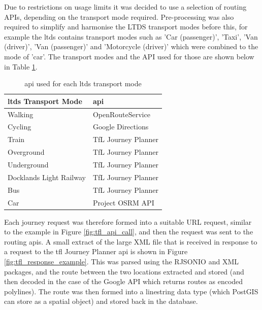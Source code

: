 Due to restrictions on usage limits it was decided to use a selection of routing APIs, depending on the transport mode required. Pre-processing was also required to simplify and harmonise the LTDS transport modes before this, for example the \gls{ltds} contains transport modes such as 'Car (passenger)', 'Taxi', 'Van (driver)', 'Van (passenger)' and 'Motorcycle (driver)' which were combined to the mode of 'car'. The transport modes and the API used for those are shown below in Table \ref{tab:api_transport_modes}.

\begin{table}[H]
\caption{\gls{api} used for each \gls{ltds} transport mode}
\centering
    \begin{tabular}{ | l | l |}
    \hline 
     \bfseries{\gls{ltds} Transport Mode} & \bfseries{\gls{api}}  \\ \hline
     Walking                    & OpenRouteService    \\ \hline
     Cycling                    & Google Directions   \\ \hline
     Train                      & TfL Journey Planner \\ \hline
     Overground                 & TfL Journey Planner \\ \hline
     Underground                & TfL Journey Planner \\ \hline
     Docklands Light Railway    & TfL Journey Planner \\ \hline
     Bus                        & TfL Journey Planner \\ \hline
     Car                        & Project OSRM API    \\ \hline
    \end{tabular}
\label{tab:api_transport_modes}
\end{table}

Each journey request was therefore formed into a suitable URL request, similar to the example in Figure \ref{fig:tfl_api_call}, and then the request was sent to the routing \gls{api}s. A small extract of the large XML file that is received in response to a request to the \gls{tfl} Journey Planner \gls{api} is shown in Figure \ref{fig:tfl_response_example}. This was parsed using the RJSONIO and XML packages, and the route between the two locations extracted and stored (and then decoded in the case of the Google API which returns routes as encoded polylines). The route was then formed into a linestring data type (which PostGIS can store as a spatial object) and stored back in the database.

